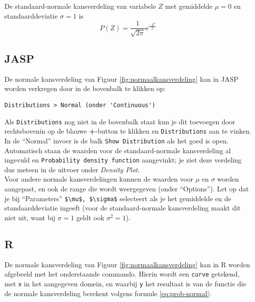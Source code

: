 \documentclass[
]{book}
\begin{document}
De standaard-normale kansverdeling van variabele \(Z\) met gemiddelde
\(\mu=0\) en standaarddeviatie \(\sigma=1\) is
\begin{equation}
    P(Z) = \frac{1}{\sqrt{2\pi}} \mbox{e}^{ \frac{-Z^2}{2} }
  \label{eq:prob-standaardnormaal}
\end{equation}

\subsection{JASP}\label{jasp-5}

De normale kansverdeling van Figuur \ref{fig:normaalkansverdeling} kan in JASP worden verkregen door in de bovenbalk te klikken op:

\begin{verbatim}
Distributions > Normal (onder 'Continuous')
\end{verbatim}

Als \texttt{Distributions} nog niet in de bovenbalk staat kun je dit toevoegen door rechtsbovenin op de blauwe \textbf{+}-button te klikken en \texttt{Distributions} aan te vinken.\\
In de ``Normal'' invoer is de balk \texttt{Show\ Distribution} als het goed is open. Automatisch staan de waarden voor de standaard-normale kansverdeling al ingevuld en \texttt{Probability\ density\ function} aangevinkt; je ziet deze verdeling dus meteen in de uitvoer onder \emph{Density Plot}.\\
Voor andere normale kansverdelingen kunnen de waarden voor \(\mu\) en \(\sigma\) worden aangepast, en ook de range die wordt weergegeven (onder ``Options''). Let op dat je bij ``Parameters'' \texttt{\$\textbackslash{}mu\$,\ \$\textbackslash{}sigma\$} selecteert als je het gemiddelde en de standaarddeviatie ingeeft (voor de standaard-normale kansverdeling maakt dit niet uit, want bij \(\sigma=1\) geldt ook \(\sigma^2=1\)).

\subsection{R}\label{r-5}

De normale kansverdeling van Figuur \ref{fig:normaalkansverdeling} kan in R worden afgebeeld
met het onderstaande commando. Hierin wordt een \texttt{curve} getekend, met \texttt{x} in het aangegeven domein, en waarbij \texttt{y} het resultaat is van de functie die de normale kansverdeling berekent volgens formule \eqref{eq:prob-normal}:
\end{document}
